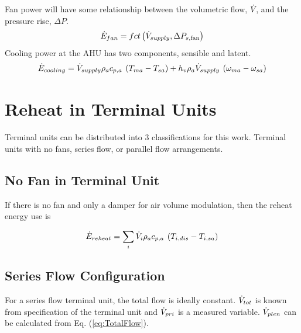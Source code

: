 Fan power will have some relationship between the volumetric flow, \(\dot{V}_{}\), and the
pressure rise, \(\Delta P\). 
\begin{equation} \label{eq:FanEqnergy}
\dot E_{fan} = fct\left( {\dot{V}_{supply},\Delta {P_{s,{\rm{fan}}}}} \right)
\end{equation}
Cooling power at the AHU has two components, sensible and latent. 
\begin{equation} \label{eq:CoolingEnergy}
    {\dot E_{cooling}} = {\dot{V}_{supply}}\rho_a c_{p,a}\:\left( {{T_{ma}} - {T_{sa}}} \right) + h_v\rho_a{\dot{V}_{supply}}\:\left( {{\omega _{ma}} - {\omega _{sa}}} \right)
\end{equation}

\section{Reheat in Terminal Units}

Terminal units can be distributed into 3 classifications for this work.
Terminal units with no fans, series flow, or parallel flow arrangements.

\subsection{No Fan in Terminal Unit}

If there is no fan and only a damper for air volume modulation, then the reheat
energy use is

\begin{equation} \label{eq:ReheatEnergy}
    {\dot E_{reheat}} = \sum\limits_i {{\dot{V}_{i}}\rho_a c_{p,a}\:\left( {{T_{i,dis}} - {T_{i,sa}}} \right)}
\end{equation}

\subsection{Series Flow Configuration}

For a series flow terminal unit, the total flow is ideally constant.
\(\dot{V}_{tot}\) is known from specification of the terminal unit and
\(\dot{V}_{pri}\) is a measured variable. \(\dot{V}_{plen}\) can be calculated from
Eq. (\ref{eq:TotalFlow}).

